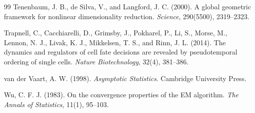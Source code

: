 \begin{thebibliography}{99}
Tenenbaum, J. B., de Silva, V., and Langford, J. C. (2000).
A global geometric framework for nonlinear dimensionality reduction.
\emph{Science}, 290(5500), 2319--2323.

Trapnell, C., Cacchiarelli, D., Grimsby, J., Pokharel, P., Li, S., Morse, M.,
Lennon, N. J., Livak, K. J., Mikkelsen, T. S., and Rinn, J. L. (2014).
The dynamics and regulators of cell fate decisions are revealed by
pseudotemporal ordering of single cells.
\emph{Nature Biotechnology}, 32(4), 381--386.

van der Vaart, A. W. (1998).
\emph{Asymptotic Statistics}.
Cambridge University Press.

Wu, C. F. J. (1983).
On the convergence properties of the EM algorithm.
\emph{The Annals of Statistics}, 11(1), 95--103.
\end{thebibliography}
